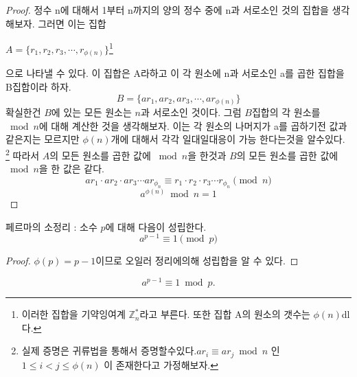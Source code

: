 \begin{proof}
    
정수 n에 대해서 1부터 n까지의 양의 정수 중에 n과 서로소인 것의 집합을 생각해보자.
그러면 이는 집합
\begin{center}
    $A = \{ r_1 ,r_2,r_3, \cdots ,r_{\phi(n)}\}$\footnote{이러한 집합을 기약잉여계 $\mathbb Z_n^*$라고 부른다. 또한 집합 A의 원소의 갯수는 $\phi(n)$dl다.}
\end{center}
으로 나타낼 수 있다. 이 집합은 A라하고 이 각 원소에 n과 서로소인 a를 곱한 집합을 B집합이라 하자.
\[B = \{ ar_1 ,ar_2,ar_3, \cdots ,ar_{\phi(n)}\} \]
확실한건 $B$에 있는 모든 원소는 $n$과 서로소인 것이다. 
그럼 $B$집합의 각 원소를 $\bmod n$에 대해 계산한 것을 생각해보자.
 이는 각 원소의 나머지가 a를 곱하기전 값과 같은지는 모르지만 $\phi(n)$개에 대해서 각각 일대일대응이 가능 한다는것을 알수있다.
  \footnote{실제 증명은 귀류법을 통해서 증명할수있다.$ar_i  \equiv ar_j \bmod n $ 인 $1 \le i < j \le \phi(n)$ 이 존재한다고 가정해보자.}
따라서 $A$의 모든 원소를 곱한 값에 $\bmod n$을 한것과 $B$의 모든 원소를 곱한 값에 $\bmod n$을 한 값은 같다.
\[ar_1 \cdot ar_2 \cdot ar_3 \cdots ar_{\phi_{n}} \equiv r_1 \cdot r_2 \cdot r_3 \cdots r_{\phi_{n}} \pmod n\]
\[a^{\phi(n)}\bmod n= 1\]
\end{proof}


\begin{corollary}
    페르마의 소정리 :  소수 $p$에 대해 다음이 성립한다.
    $$ a^{p-1} \equiv 1 \pmod{p}$$
\end{corollary}

\begin{proof}
    $\phi(p)  = p-1 $이므로 오일러 정리에의해 성립합을 알 수 있다.
\end{proof}


\begin{equation*}
    a^{p-1} \equiv 1 \bmod p.
\end{equation*}
    
